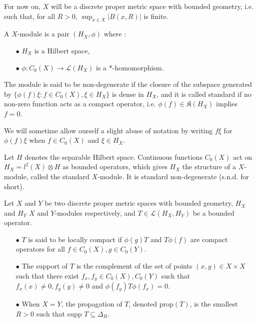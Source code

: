 For now on, $X$ will be a discrete proper metric space with bounded geometry, i.e. such that, for all $R>0$, $\sup_{x\in X} |B(x,R)|$ is finite. 

\begin{definition} A $X$-module is a pair $(H_X,\phi)$ where :
\begin{itemize}
\item[$\bullet$] $H_X$ is a Hilbert space,
\item[$\bullet$] $\phi : C_0(X)\rightarrow \mathcal L(H_X)$ is a $*$-homomorphism. 
\end{itemize}
The module is said to be non-degenerate if the closure of the subspace generated by $\{\phi(f)\xi : f\in C_0(X), \xi\in H_X\}$ is dense in $H_X$, and it is called standard if no non-zero function acts as a compact operator, i.e. $\phi(f) \in\mathfrak K(H_X)$ implies $f=0$.
\end{definition}

We will sometime allow ourself a slight abuse of notation by writing $f\xi$ for $\phi(f)\xi$ when $f\in C_0(X)$ and $\xi \in H_X$.

\begin{Expl}
Let $H$ denotes the separable Hilbert space. Continuous functions $C_0(X)$ act on $H_X =l^2(X)\otimes H$ as bounded operators, which gives $H_X$ the structure of a $X$-module, called the standard $X$-module. It is standard non-degenerate (s.n.d. for short).  
\end{Expl}

\begin{definition}
Let $X$ and $Y$ be two discrete proper metric spaces with bounded geometry, $H_X$ and $H_Y$ $X$ and $Y$-modules respectively, and $T\in \mathcal L(H_X, H_Y)$ be a bounded operator.
\begin{itemize}
\item[$\bullet$] $T$ is said to be locally compact if $\phi(g)T$ and $T\phi(f)$ are compact operators for all $f\in C_0(X),g\in C_0(Y)$.
\item[$\bullet$] The support of $T$ is the complement of the set of points $(x,y)\in X\times X$ such that there exist $f_x,f_y\in C_0(X),C_0(Y)$ such that $f_x(x)\neq 0,f_{y}(y)\neq 0$ and $\phi(f_{y}) T \phi(f_x)=0$.
\item[$\bullet$] When $X=Y$, the propagation of $T$, denoted prop$(T)$, is the smallest $R>0$ such that supp $T \subseteq \Delta_R$.
\end{itemize}
\end{definition}

